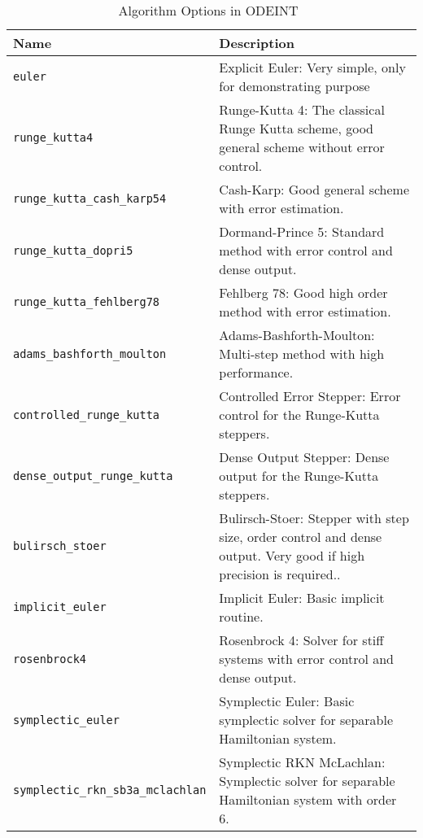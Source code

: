 \begin{table}[ht]
\begin{tabular}{ p{} p{} }
	\textbf{Name} & \textbf{Description} \\
	\toprule
	\verb|euler| & Explicit Euler: Very simple, only for demonstrating purpose\\ \hline
	\verb|runge_kutta4| & Runge-Kutta 4: The classical Runge Kutta scheme, good general scheme without error control.\\ \hline
	\verb|runge_kutta_cash_karp54| & Cash-Karp: Good general scheme with error estimation.\\ \hline
	\verb|runge_kutta_dopri5| & Dormand-Prince 5: Standard method with error control and dense output.\\ \hline
	\verb|runge_kutta_fehlberg78| & Fehlberg 78: Good high order method with error estimation.\\ \hline

	\verb|adams_bashforth_moulton| & Adams-Bashforth-Moulton: Multi-step method with high performance.\\ \hline
	\verb|controlled_runge_kutta| & Controlled Error Stepper: Error control for the Runge-Kutta steppers.\\ \hline
	\verb|dense_output_runge_kutta| & Dense Output Stepper: Dense output for the Runge-Kutta steppers.\\ \hline
	\verb|bulirsch_stoer| & Bulirsch-Stoer: Stepper with step size, order control and dense output. Very good if high precision is required..\\ \hline
	\verb|implicit_euler| & Implicit Euler: Basic implicit routine.\\ \hline
	\verb|rosenbrock4| & Rosenbrock 4: Solver for stiff systems with error control and dense output.\\ \hline
	\verb|symplectic_euler| & Symplectic Euler: Basic symplectic solver for separable Hamiltonian system.\\ \hline
	\verb|symplectic_rkn_sb3a_mclachlan| & Symplectic RKN McLachlan: Symplectic solver for separable Hamiltonian system with order 6.\\
	\bottomrule	
\end{tabular}	
\caption{Algorithm Options in ODEINT~\citep{odeintfun}}	
\label{tab_algodeint}
\end{table}
